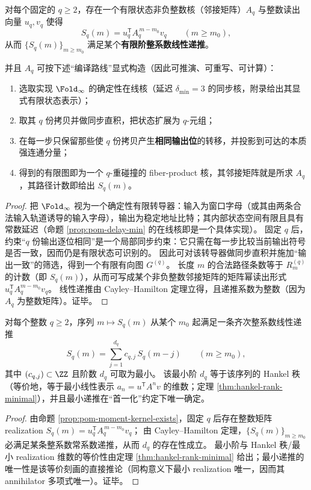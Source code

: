 \begin{proposition}\label{prop:pom-moment-kernel-exists}
对每个固定的 \(q\ge 2\)，存在一个有限状态非负整数核（邻接矩阵）\(A_q\) 与整数读出向量 \(u_q,v_q\) 使得
$$
S_q(m)=u_q^{\mathsf T}A_q^{\,m-m_0}v_q\qquad(m\ge m_0),
$$
从而 \(\{S_q(m)\}_{m\ge m_0}\) 满足某个\textbf{有限阶整系数线性递推}。

并且 \(A_q\) 可按下述“编译路线”显式构造（因此可推演、可重写、可计算）：
\begin{enumerate}
  \item 选取实现 \(\Fold_\infty\) 的确定性在线核（延迟 \(\delta_{\min}=3\) 的同步核，附录给出其显式有限状态表示）；
  \item 取其 \(q\) 份拷贝并做同步直积，把状态扩展为 \(q\)-元组；
  \item 在每一步只保留那些使 \(q\) 份拷贝产生\textbf{相同输出位}的转移，并投影到可达的本质强连通分量；
  \item 得到的有限图即为一个 \(q\)-重碰撞的 fiber-product 核，其邻接矩阵就是所求 \(A_q\)，其路径计数即给出 \(S_q(m)\)。
\end{enumerate}
\end{proposition}

\begin{proof}
把 \(\Fold_\infty\) 视为一个确定性有限转导器：输入为窗口字母（或其由两条合法输入轨道诱导的输入字母），输出为稳定地址比特；其内部状态空间有限且具有常数延迟（命题 \ref{prop:pom-delay-min} 的在线核即是一个具体实现）。
固定 \(q\) 后，约束“\(q\) 份输出逐位相同”是一个局部同步约束：它只需在每一步比较当前输出符号是否一致，因而仍是有限状态可识别的。
因此可对该转导器做同步直积并施加“输出一致”的筛选，得到一个有限有向图 \(G^{(q)}\)。
长度 \(m\) 的合法路径条数等于 \(R_m^{(q)}\) 的计数（即 \(S_q(m)\)），从而可写成某个非负整数邻接矩阵的矩阵幂读出形式 \(u_q^{\mathsf T}A_q^{m-m_0}v_q\)。
线性递推由 Cayley--Hamilton 定理立得，且递推系数为整数（因为 \(A_q\) 为整数矩阵）。证毕。
\end{proof}

\begin{proposition}\label{prop:pom-moment-minrecurrence-hankel}
对每个整数 \(q\ge 2\)，序列 \(m\mapsto S_q(m)\) 从某个 \(m_0\) 起满足一条齐次整系数线性递推
\[
S_q(m)=\sum_{j=1}^{d_q} c_{q,j}\,S_q(m-j)\qquad(m\ge m_0),
\]
其中 \((c_{q,j})\subset\ZZ\) 且阶数 \(d_q\) 可取为最小。
该最小阶 \(d_q\) 等于该序列的 Hankel 秩（等价地，等于最小线性表示 \(a_n=u^{\mathsf T}A^n v\) 的维数；定理 \ref{thm:hankel-rank-minimal}），并且最小递推在“首一化”约定下唯一确定。
\end{proposition}
\begin{proof}
由命题 \ref{prop:pom-moment-kernel-exists}，固定 \(q\) 后存在整数矩阵 realization \(S_q(m)=u_q^{\mathsf T}A_q^{\,m-m_0}v_q\)；
由 Cayley--Hamilton 定理，\(\{S_q(m)\}_{m\ge m_0}\) 必满足某条整系数常系数递推，从而 \(d_q\) 的存在性成立。
最小阶与 Hankel 秩/最小 realization 维数的等价性由定理 \ref{thm:hankel-rank-minimal} 给出；最小递推的唯一性是该等价刻画的直接推论（同构意义下最小 realization 唯一，因而其 annihilator 多项式唯一）。证毕。
\end{proof}

